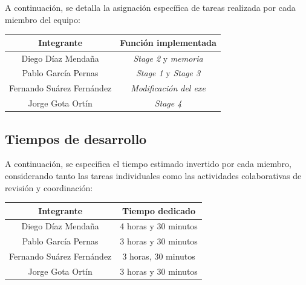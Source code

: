 \documentclass[11pt,a4paper]{article}
\begin{document}
\noindent A continuación, se detalla la asignación específica de tareas realizada por cada miembro del equipo: \vspace{1ex}
\begin{center}
  \renewcommand{\arraystretch}{1.2}
  \begin{tabular}{|c|c|}
    \hline
    \textbf{Integrante}\cellcolor{azulSuave} & \textbf{Función implementada}\cellcolor{azulSuave} \\
    \hline
    Diego Díaz Mendaña & \textit{Stage 2} y \textit{memoria} \\
    Pablo García Pernas & \textit{Stage 1} y \textit{Stage 3} \\
    Fernando Suárez Fernández & \textit{Modificación del exe} \\
    Jorge Gota Ortín & \textit{Stage 4} \\
    \hline
  \end{tabular}
\end{center}
\vspace{3ex}

\subsection{Tiempos de desarrollo}
A continuación, se especifica el tiempo estimado invertido por cada miembro, considerando tanto las tareas individuales como las actividades colaborativas de revisión y coordinación: \vspace{2ex}
\begin{center}
  \renewcommand{\arraystretch}{1.2}
  \begin{tabular}{|c|c|}
    \hline
    \textbf{Integrante}\cellcolor{azulSuave} & \textbf{Tiempo dedicado}\cellcolor{azulSuave} \\
    \hline
    Diego Díaz Mendaña & 4 horas y 30 minutos \\
    Pablo García Pernas & 3 horas y 30 minutos \\
    Fernando Suárez Fernández & 3 horas, 30 minutos \\
    Jorge Gota Ortín & 3 horas y 30 minutos\\
    \hline
  \end{tabular}
\end{center}
\end{document}
